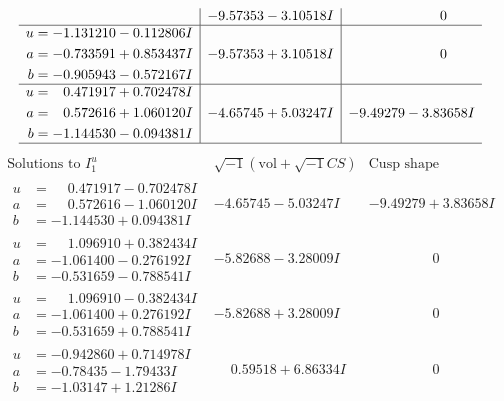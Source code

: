 \documentclass[1p]{elsarticle_modified}
\theoremstyle{definition}
\newcommand{\I}{\sqrt{-1}}
\begin{document}
$$\begin{array}{c|c|c}
 & -9.57353 - 3.10518 I & \phantom{-0.000000 } 0 \\ \hline\begin{aligned}
u &= -1.131210 - 0.112806 I \\
a &= -0.733591 + 0.853437 I \\
b &= -0.905943 - 0.572167 I\end{aligned}
 & -9.57353 + 3.10518 I & \phantom{-0.000000 } 0 \\ \hline\begin{aligned}
u &= \phantom{-}0.471917 + 0.702478 I \\
a &= \phantom{-}0.572616 + 1.060120 I \\
b &= -1.144530 - 0.094381 I\end{aligned}
 & -4.65745 + 5.03247 I & -9.49279 - 3.83658 I\\
 \hline 
 \end{array}$$\newpage$$\begin{array}{c|c|c}  
\text{Solutions to }I^u_{1}& \I (\text{vol} + \sqrt{-1}CS) & \text{Cusp shape}\\
 \hline 
\begin{aligned}
u &= \phantom{-}0.471917 - 0.702478 I \\
a &= \phantom{-}0.572616 - 1.060120 I \\
b &= -1.144530 + 0.094381 I\end{aligned}
 & -4.65745 - 5.03247 I & -9.49279 + 3.83658 I \\ \hline\begin{aligned}
u &= \phantom{-}1.096910 + 0.382434 I \\
a &= -1.061400 - 0.276192 I \\
b &= -0.531659 - 0.788541 I\end{aligned}
 & -5.82688 - 3.28009 I & \phantom{-0.000000 } 0 \\ \hline\begin{aligned}
u &= \phantom{-}1.096910 - 0.382434 I \\
a &= -1.061400 + 0.276192 I \\
b &= -0.531659 + 0.788541 I\end{aligned}
 & -5.82688 + 3.28009 I & \phantom{-0.000000 } 0 \\ \hline\begin{aligned}
u &= -0.942860 + 0.714978 I \\
a &= -0.78435 - 1.79433 I \\
b &= -1.03147 + 1.21286 I\end{aligned}
 & \phantom{-}0.59518 + 6.86334 I & \phantom{-0.000000 } 0 \\ \hline\begin{aligned}

\end{aligned}
\end{array}$$
\end{document}
